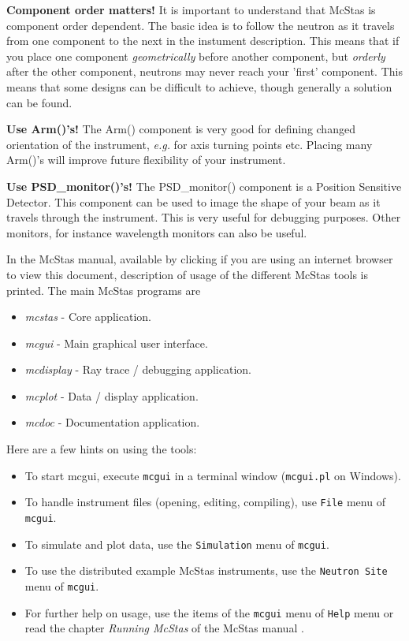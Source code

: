 \begin{itemize}
{\item{{\bf Component order matters!} It is important to understand
    that McStas is component order dependent. The basic idea is to
    follow the neutron as it travels from one component to the next in
    the instument description. This means that if you place one component
    \emph{geometrically} before another component, but \emph{orderly}
    after the other component, neutrons may never reach your 'first'
    component. This means that some designs can be difficult to
    achieve, though generally a solution can be found.}
\item{{\bf Use Arm()'s!} The Arm() component is very good for defining
  changed orientation of the instrument, \emph{e.g.} for axis turning points
  etc. Placing many Arm()'s will improve future flexibility of your
  instrument.}
\item{{\bf Use PSD\_monitor()'s!} The PSD\_monitor() component is a
    Position Sensitive Detector. This component can
    be used to image the shape of your beam as it travels through the
    instrument. This is very useful for debugging purposes. Other
    monitors, for instance wavelength monitors can also be useful.}}
\end{itemize}
In the McStas manual, available by clicking
if you are using an internet browser to view this document, description
of usage of the different McStas tools is printed. The main McStas
programs are
\begin{itemize}
\item{\emph{mcstas} - Core application.}
\item{\emph{mcgui} - Main graphical user interface.}
\item{\emph{mcdisplay} - Ray trace / debugging application.}
\item{\emph{mcplot} - Data / display application.}
\item{\emph{mcdoc} - Documentation application.}
\end{itemize}
Here are a few hints on using the tools:
\begin{itemize}
\item To start mcgui, execute \verb+mcgui+ in a terminal window
  (\verb+mcgui.pl+ on Windows).
\item To handle instrument files (opening, editing, compiling), use \verb+File+ menu of \verb+mcgui+.
\item To simulate and plot data, use the \verb+Simulation+ menu of \verb+mcgui+.
\item To use the distributed example McStas instruments, use the \verb+Neutron Site+ menu of \verb+mcgui+.
\item For further help on usage, use the items of the \verb+mcgui+
  menu of \verb+Help+ menu or read the chapter \emph{Running McStas}
  of the McStas manual \cite{Manual}.
\end{itemize}
